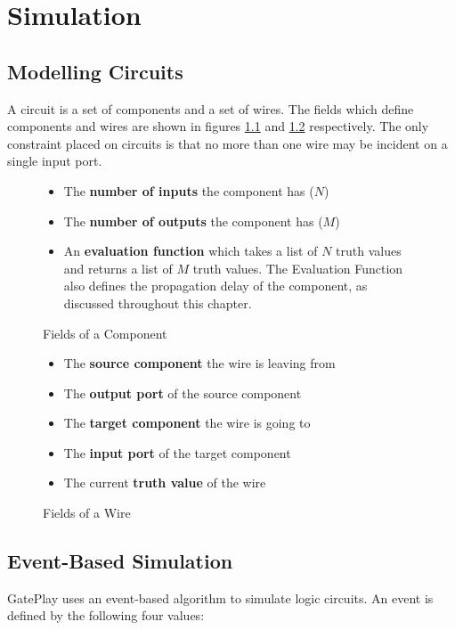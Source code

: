 \chapter{Simulation}
\section{Modelling Circuits}
A circuit is a set of components and a set of wires. The fields which define components and wires are shown in figures \ref{fig:component} and \ref{fig:wire} respectively. The only constraint placed on circuits is that no more than one wire may be incident on a single input port.

\begin{figure}[H]
\centering
\begin{itemize}
	\item The \textbf{number of inputs} the component has ($N$)
	\item The \textbf{number of outputs} the component has ($M$)
	\item An \textbf{evaluation function} which takes a list of $N$ truth values and returns a list  of $M$ truth values. The Evaluation Function also defines the propagation delay of the component, as discussed throughout this chapter.
\end{itemize}
\label{fig:component}
\caption{Fields of a Component}
\end{figure}

\begin{figure}[H]
\centering
\begin{itemize}
	\item The \textbf{source component} the wire is leaving from
	\item The \textbf{output port} of the source component
	\item The \textbf{target component} the wire is going to
	\item The \textbf{input port} of the target component
	\item The current \textbf{truth value} of the wire 
\end{itemize}
\label{fig:wire}
\caption{Fields of a Wire}
\end{figure}

\section{Event-Based Simulation}
GatePlay uses an event-based algorithm to simulate logic circuits. An event is defined by the following four values:


